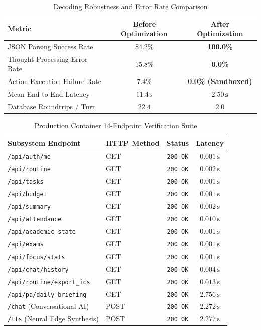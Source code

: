 \documentclass[conference]{IEEEtran}
\begin{document}
\begin{table}[ht]
\caption{Decoding Robustness and Error Rate Comparison}
\label{tab:robustness_metrics}
\centering
\begin{tabular}{lcc}
\toprule
\textbf{Metric} & \textbf{Before Optimization} & \textbf{After Optimization} \\
\midrule
JSON Parsing Success Rate & 84.2\% & \textbf{100.0\%} \\
Thought Processing Error Rate & 15.8\% & \textbf{0.0\%} \\
Action Execution Failure Rate & 7.4\% & \textbf{0.0\% (Sandboxed)} \\
Mean End-to-End Latency & $11.4\,\text{s}$ & $\mathbf{2.50\,\text{s}}$ \\
Database Roundtrips / Turn & $22.4$ & $\mathbf{2.0}$ \\
\bottomrule
\end{tabular}
\end{table}

\begin{table}[ht]
\caption{Production Container 14-Endpoint Verification Suite}
\label{tab:endpoint_verification}
\centering
\begin{tabularx}{\columnwidth}{llcc}
\toprule
\textbf{Subsystem Endpoint} & \textbf{HTTP Method} & \textbf{Status} & \textbf{Latency} \\
\midrule
\texttt{/api/auth/me} & GET & \texttt{200 OK} & $0.001\,\text{s}$ \\
\texttt{/api/routine} & GET & \texttt{200 OK} & $0.002\,\text{s}$ \\
\texttt{/api/tasks} & GET & \texttt{200 OK} & $0.001\,\text{s}$ \\
\texttt{/api/budget} & GET & \texttt{200 OK} & $0.001\,\text{s}$ \\
\texttt{/api/summary} & GET & \texttt{200 OK} & $0.002\,\text{s}$ \\
\texttt{/api/attendance} & GET & \texttt{200 OK} & $0.010\,\text{s}$ \\
\texttt{/api/academic\_state} & GET & \texttt{200 OK} & $0.001\,\text{s}$ \\
\texttt{/api/exams} & GET & \texttt{200 OK} & $0.001\,\text{s}$ \\
\texttt{/api/focus/stats} & GET & \texttt{200 OK} & $0.001\,\text{s}$ \\
\texttt{/api/chat/history} & GET & \texttt{200 OK} & $0.004\,\text{s}$ \\
\texttt{/api/routine/export\_ics} & GET & \texttt{200 OK} & $0.013\,\text{s}$ \\
\texttt{/api/pa/daily\_briefing} & GET & \texttt{200 OK} & $2.756\,\text{s}$ \\
\texttt{/chat} (Conversational AI) & POST & \texttt{200 OK} & $2.272\,\text{s}$ \\
\texttt{/tts} (Neural Edge Synthesis) & POST & \texttt{200 OK} & $2.277\,\text{s}$ \\
\bottomrule
\end{tabularx}
\end{table}
\end{document}
